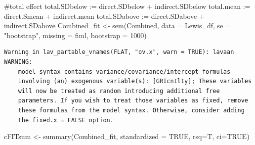 \documentclass[
  11pt,
]{book}
\newenvironment{Shaded}{\begin{snugshade}}{\end{snugshade}}
\newcommand{\AttributeTok}[1]{\textcolor[rgb]{0.77,0.63,0.00}{#1}}
\newcommand{\ConstantTok}[1]{\textcolor[rgb]{0.00,0.00,0.00}{#1}}
\newcommand{\DecValTok}[1]{\textcolor[rgb]{0.00,0.00,0.81}{#1}}
\newcommand{\FunctionTok}[1]{\textcolor[rgb]{0.00,0.00,0.00}{#1}}
\newcommand{\NormalTok}[1]{#1}
\newcommand{\OtherTok}[1]{\textcolor[rgb]{0.56,0.35,0.01}{#1}}
\newcommand{\StringTok}[1]{\textcolor[rgb]{0.31,0.60,0.02}{#1}}
\begin{document}
\begin{Shaded}
\begin{Highlighting}[]
\StringTok{    \#total effect}
\StringTok{    total.SDbelow := direct.SDbelow + indirect.SDbelow}
\StringTok{    total.mean := direct.Smean + indirect.mean}
\StringTok{    total.SDabove := direct.SDabove + indirect.SDabove}
\StringTok{ \textquotesingle{}}
\NormalTok{Combined\_fit }\OtherTok{\textless{}{-}} \FunctionTok{sem}\NormalTok{(Combined, }\AttributeTok{data =}\NormalTok{ Lewis\_df, }\AttributeTok{se =} \StringTok{"bootstrap"}\NormalTok{, }\AttributeTok{missing =} \StringTok{\textquotesingle{}fiml\textquotesingle{}}\NormalTok{, }\AttributeTok{bootstrap =} \DecValTok{1000}\NormalTok{)}
\end{Highlighting}
\end{Shaded}

\begin{verbatim}
Warning in lav_partable_vnames(FLAT, "ov.x", warn = TRUE): lavaan WARNING:
    model syntax contains variance/covariance/intercept formulas
    involving (an) exogenous variable(s): [GRIcntlty]; These variables
    will now be treated as random introducing additional free
    parameters. If you wish to treat those variables as fixed, remove
    these formulas from the model syntax. Otherwise, consider adding
    the fixed.x = FALSE option.
\end{verbatim}

\begin{Shaded}
\begin{Highlighting}[]
\NormalTok{cFITsum }\OtherTok{\textless{}{-}} \FunctionTok{summary}\NormalTok{(Combined\_fit, }\AttributeTok{standardized =} \ConstantTok{TRUE}\NormalTok{, }\AttributeTok{rsq=}\NormalTok{T, }\AttributeTok{ci=}\ConstantTok{TRUE}\NormalTok{)    }
\end{Highlighting}
\end{Shaded}
\end{document}
